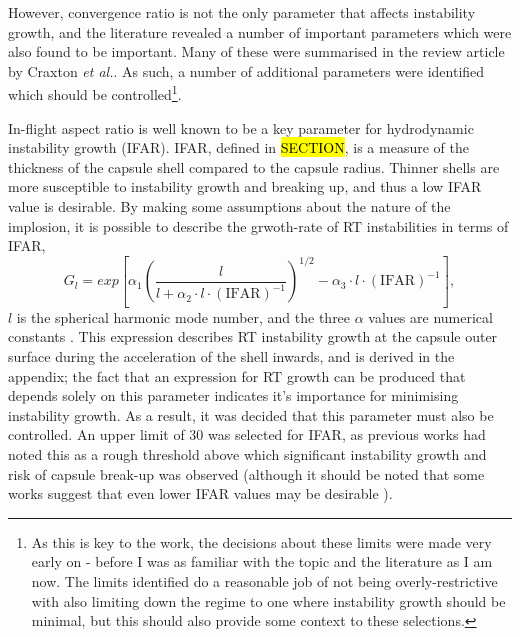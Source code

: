 
However, convergence ratio  is not the only parameter that affects instability growth, and the literature revealed a number of important parameters which were also found to be important. Many of these were summarised in the review article by Craxton \textit{et al.}\cite{Craxton2015}. As such, a number of additional parameters were identified which should be controlled\footnote{As this is key to the work, the decisions about these limits were made very early on - before I was as familiar with the topic and the literature as I am now. The limits identified do a reasonable job of not being overly-restrictive with also limiting down the regime to one where instability growth should be minimal, but this should also provide some context to these selections.}.

In-flight aspect ratio is well known to be a key parameter for hydrodynamic instability growth (IFAR). IFAR, defined in \hl{SECTION}, is a measure of the thickness of the capsule shell compared to the capsule radius. Thinner shells are more susceptible to instability growth and breaking up, and thus a low IFAR value is desirable. By making some assumptions about the nature of the implosion, it is possible to describe the grwoth-rate of RT instabilities in terms of IFAR, 
\begin{equation} G_l = exp \left[ \alpha_1 \left( \frac{l}{l + \alpha_2 \cdot l \cdot (\mathrm{IFAR})^{-1}} \right)^{1/2} - \alpha_3 \cdot l \cdot (\mathrm{IFAR})^{-1} \right], \label{eq: IFARGrowth} \end{equation} $l$ is the spherical harmonic mode number, and the three $\alpha$ values are numerical constants \cite{Atzeni2008}. This expression describes RT instability growth at the capsule outer surface during the acceleration of the shell inwards, and is derived in the appendix; the fact that an expression for RT growth can be produced that depends solely on this parameter indicates it's importance for minimising instability growth. As a result, it was decided that this parameter must also be controlled. An upper limit of 30 was selected for IFAR, as previous works had noted this as a rough threshold above which significant instability growth and risk of capsule break-up was observed \cite{Lindl1995} (although it should be noted that some works suggest that even lower IFAR values may be desirable \cite{Radha2011, Goncharov2003}).


